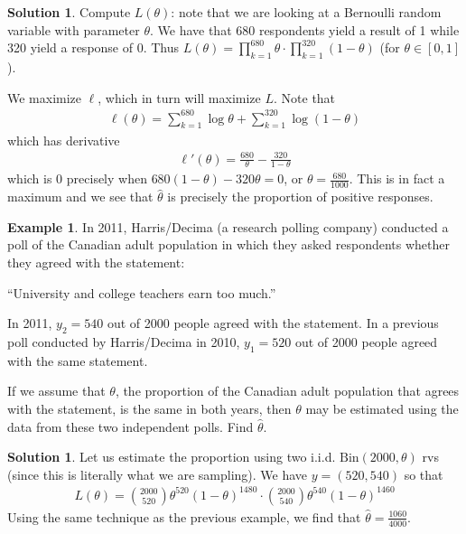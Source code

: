 \documentclass[11pt]{amsart}
\theoremstyle{definition}
\newtheorem{example}[theorem]{Example}
\newtheorem{solution}[theorem]{Solution}
\numberwithin{equation}{section}
\begin{document}
\addtocounter{theorem}{-1}
\begin{solution}
    Compute $L(\theta)$: note that we are looking at a Bernoulli random variable with parameter $\theta$. We have that 680 respondents yield a result of 1 while 320 yield a response of 0. Thus $L(\theta)=\prod_{k=1}^{680}\theta\cdot\prod_{k=1}^{320}(1-\theta)$ (for $\theta\in[0,1]$).

    We maximize $\ell$, which in turn will maximize $L$. Note that 
    \begin{align*}
        \ell(\theta)=\sum_{k=1}^{680}\log\theta+\sum_{k=1}^{320}\log(1-\theta)
    \end{align*}
    which has derivative
    \begin{align*}
        \ell'(\theta)=\frac{680}{\theta}-\frac{320}{1-\theta}
    \end{align*}
    which is 0 precisely when $680(1-\theta)-320\theta=0$, or $\theta=\frac{680}{1000}$. This is in fact a maximum and we see that $\hat{\theta}$ is precisely the proportion of positive responses.
\end{solution}
\begin{example}
    In 2011, Harris/Decima (a research polling company) conducted a poll of the Canadian adult population in which they asked respondents whether they agreed with the statement:

    “University and college teachers earn too much.”

    In 2011, $y_2 = 540$ out of 2000 people agreed with the statement. In a previous poll conducted by Harris/Decima in 2010, $y_1 = 520$ out of 2000 people agreed with the same statement.

    If we assume that $\theta$, the proportion of the Canadian adult population that agrees with the statement, is the same in both years, then $\theta$ may be estimated using the data from these two independent polls. Find $\hat\theta$.
\end{example}
\addtocounter{theorem}{-1}
\begin{solution}
    Let us estimate the proportion using two i.i.d. $\mathrm{Bin}(2000,\theta)$ rvs (since this is literally what we are sampling). We have $y=(520, 540)$ so that 
    \begin{align*}
        L(\theta)=\binom{2000}{520}\theta^{520}(1-\theta)^{1480}\cdot\binom{2000}{540}\theta^{540}(1-\theta)^{1460}
    \end{align*}
    Using the same technique as the previous example, we find that $\hat{\theta}=\frac{1060}{4000}$.
\end{solution}
\end{document}
